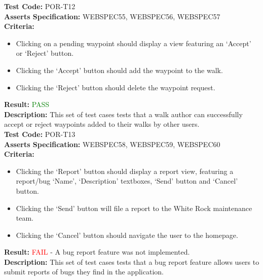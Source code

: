 \documentclass[11pt,a4paper]{report}
\begin{document}
\label{test:POR-T12}
\noindent\textbf{Test Code:} POR-T12\\
\textbf{Asserts Specification:} WEBSPEC55, WEBSPEC56, WEBSPEC57\\ 
\textbf{Criteria:} \begin{itemize}
                     \item Clicking on a pending waypoint should display a view featuring an `Accept' or `Reject' button.
                     \item Clicking the `Accept' button should add the waypoint to the walk.
                     \item Clicking the `Reject' button should delete the waypoint request.
                   \end{itemize}  
\textbf{Result:} \textcolor{green}{PASS}\\
\textbf{Description:} This set of test cases tests that a walk author can successfully accept or reject waypoints added to their walks by other users. \\

\label{test:POR-T13}
\noindent\textbf{Test Code:} POR-T13\\
\textbf{Asserts Specification:} WEBSPEC58, WEBSPEC59, WEBSPEC60\\ 
\textbf{Criteria:} \begin{itemize}
                     \item Clicking the `Report' button should display a report view, featuring a report/bug `Name', `Description' textboxes, `Send' button and `Cancel' button.
                     \item Clicking the `Send' button will file a report to the White Rock maintenance team.
                     \item Clicking the `Cancel' button should navigate the user to the homepage.
                   \end{itemize}  
\textbf{Result:} \textcolor{red}{FAIL} - A bug report feature was not implemented.\\
\textbf{Description:} This set of test cases tests that a bug report feature allows users to submit reports of bugs they find in the application. \\
\end{document}
